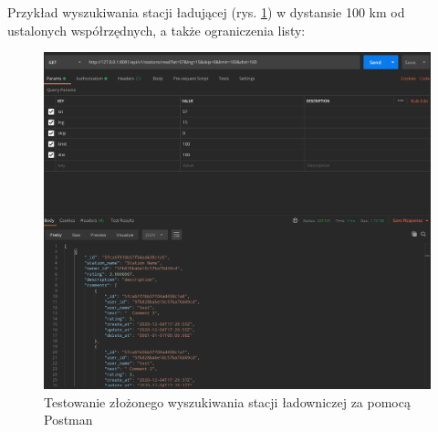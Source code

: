 \newpage
Przykład wyszukiwania stacji ładującej (rys. \ref{fig:postman_find_stations}) w dystansie 100 km od ustalonych współrzędnych, a także ograniczenia listy:
\begin{figure}[ht]
    \centering
        \includegraphics[width=0.9\linewidth]{rys04/postman_find_stations.png}
        \caption{Testowanie złożonego wyszukiwania stacji ładowniczej za pomocą Postman}
    \label{fig:postman_find_stations}
\end{figure}